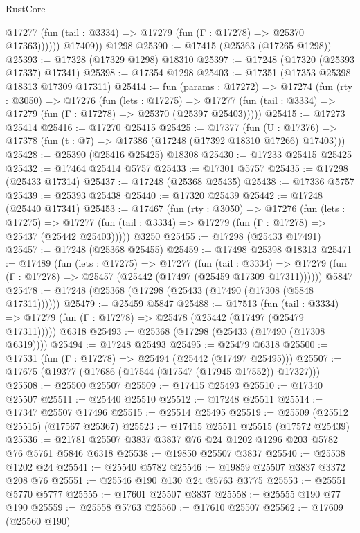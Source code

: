 \begin{lexlean}{RustCore}
\begin{coremodule}
              @17277 (fun (tail : @3334) => @17279 (fun (Γ : @17278) => @25370 @17363))))))
        @17409))
    @1298
@25390 := @17415 (@25363 (@17265 @1298))
@25393 := @17328 (@17329 @1298) @18310
@25397 := @17248 (@17320 (@25393 @17337) @17341)
@25398 := @17354 @1298
@25403 := @17351 (@17353 @25398 @18313 @17309 @17311)
@25414 := fun (params : @17272) =>
  @17274
    (fun (rty : @3050) =>
    @17276
      (fun (lets : @17275) =>
      @17277 (fun (tail : @3334) => @17279 (fun (Γ : @17278) => @25370 (@25397 @25403)))))
@25415 := @17273 @25414
@25416 := @17270 @25415
@25425 := @17377
    (fun (U : @17376) => @17378 (fun (t : @7) => @17386 (@17248 (@17392 @18310 @17266) @17403)))
@25428 := @25390 (@25416 @25425) @18308
@25430 := @17233 @25415 @25425
@25432 := @17464 @25414 @5757
@25433 := @17301 @5757
@25435 := @17298 (@25433 @17314)
@25437 := @17248 (@25368 @25435)
@25438 := @17336 @5757
@25439 := @25393 @25438
@25440 := @17320 @25439
@25442 := @17248 (@25440 @17341)
@25453 := @17467
    (fun (rty : @3050) =>
    @17276
      (fun (lets : @17275) =>
      @17277 (fun (tail : @3334) => @17279 (fun (Γ : @17278) => @25437 (@25442 @25403)))))
    @3250
@25455 := @17298 (@25433 @17491)
@25457 := @17248 (@25368 @25455)
@25459 := @17498 @25398 @18313
@25471 := @17489
    (fun (lets : @17275) =>
    @17277
      (fun (tail : @3334) =>
      @17279 (fun (Γ : @17278) => @25457 (@25442 (@17497 (@25459 @17309 @17311))))))
    @5847
@25478 := @17248 (@25368 (@17298 (@25433 (@17490 (@17308 (@5848 @17311))))))
@25479 := @25459 @5847
@25488 := @17513
    (fun (tail : @3334) => @17279 (fun (Γ : @17278) => @25478 (@25442 (@17497 (@25479 @17311)))))
    @6318
@25493 := @25368 (@17298 (@25433 (@17490 (@17308 @6319))))
@25494 := @17248 @25493
@25495 := @25479 @6318
@25500 := @17531 (fun (Γ : @17278) => @25494 (@25442 (@17497 @25495)))
@25507 := @17675 (@19377 (@17686 (@17544 (@17547 (@17945 @17552)) @17327)))
@25508 := @25500 @25507
@25509 := @17415 @25493
@25510 := @17340 @25507
@25511 := @25440 @25510
@25512 := @17248 @25511
@25514 := @17347 @25507 @17496
@25515 := @25514 @25495
@25519 := @25509 (@25512 @25515) (@17567 @25367)
@25523 := @17415 @25511 @25515 (@17572 @25439)
@25536 := @21781 @25507 @3837 @3837 @76 @24 @1202 @1296 @203 @5782 @76 @5761 @5846 @6318
@25538 := @19850 @25507 @3837
@25540 := @25538 @1202 @24
@25541 := @25540 @5782
@25546 := @19859 @25507 @3837 @3372 @208 @76
@25551 := @25546 @190 @130 @24 @5763 @3775
@25553 := @25551 @5770 @5777
@25555 := @17601 @25507 @3837
@25558 := @25555 @190 @77 @190
@25559 := @25558 @5763
@25560 := @17610 @25507
@25562 := @17609 (@25560 @190)

\end{coremodule}
\end{lexlean}
